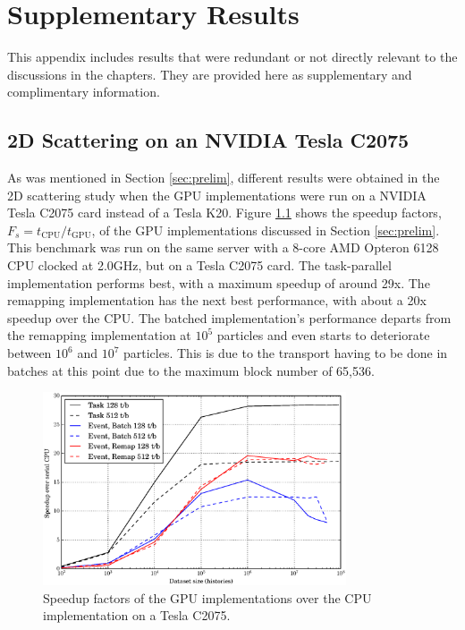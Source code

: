 \chapter{Supplementary Results}
\label{app:A}

This appendix includes results that were redundant or not directly relevant to the discussions in the chapters.  They are provided here as supplementary and complimentary information.

\section{2D Scattering on an NVIDIA Tesla C2075}

As was mentioned in Section \ref{sec:prelim}, different results were obtained in the 2D scattering study when the GPU implementations were run on a NVIDIA Tesla C2075 card instead of a Tesla K20.  Figure \ref{prelim_speedup_old} shows the speedup factors, $F_s=t_\mathrm{CPU}/t_\mathrm{GPU}$, of the GPU implementations discussed in Section \ref{sec:prelim}.  This benchmark was run on the same server with a 8-core AMD Opteron 6128 CPU clocked at 2.0GHz, but on a Tesla C2075 card.   The task-parallel implementation performs best, with a maximum speedup of around 29x.  The remapping implementation has the next best performance, with about a 20x speedup over the CPU. The batched implementation's performance departs from the remapping implementation at $10^5$ particles and even starts to deteriorate between $10^6$ and $10^7$ particles.  This is due to the transport having to be done in batches at this point due to the maximum block number of 65,536.  

\begin{figure}[h!] 
  \centering
    \includegraphics[width=0.8\textwidth]{graphics/prelim_speedup_old.eps}
     \caption{Speedup factors of the GPU implementations over the CPU implementation on a Tesla C2075. \label{prelim_speedup_old} }
\end{figure}

